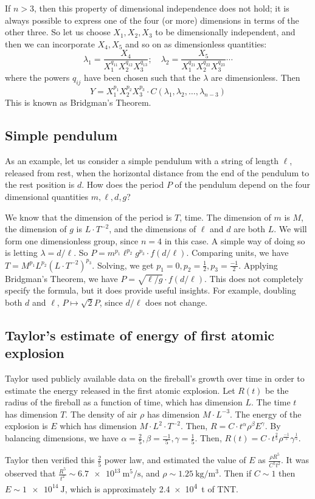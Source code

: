 If \(n > 3\), then this property of dimensional independence does not hold; it is always possible to express one of the four (or more) dimensions in terms of the other three.
So let us choose \(X_1, X_2, X_3\) to be dimensionally independent, and then we can incorporate \(X_4, X_5\) and so on as dimensionless quantities:
\[
	\lambda_1 = \frac{X_4}{X_1^{q_{11}}X_2^{q_{12}}X_3^{q_{13}}};\quad \lambda_2 = \frac{X_5}{X_1^{q_{21}}X_2^{q_{22}}X_3^{q_{23}}} \cdots
\]
where the powers \(q_{ij}\) have been chosen such that the \(\lambda\) are dimensionless.
Then
\[
	Y = X_1^{p_1}X_2^{p_2}X_3^{p_3} \cdot C(\lambda_1, \lambda_2, \dots, \lambda_{n-3})
\]
This is known as Bridgman's Theorem.

\subsection{Simple pendulum}
As an example, let us consider a simple pendulum with a string of length \(\ell\), released from rest, when the horizontal distance from the end of the pendulum to the rest position is \(d\).
How does the period \(P\) of the pendulum depend on the four dimensional quantities \(m, \ell, d, g\)?

We know that the dimension of the period is \(T\), time.
The dimension of \(m\) is \(M\), the dimension of \(g\) is \(L \cdot T^{-2}\), and the dimensions of \(\ell\) and \(d\) are both \(L\).
We will form one dimensionless group, since \(n=4\) in this case.
A simple way of doing so is letting \(\lambda = d/\ell\).
So \(P = m^{p_1} \ell^{p_2} g^{p_3} \cdot f(d/\ell)\).
Comparing units, we have \(T = M^{p_1} L^{p_2} (L \cdot T^{-2})^{p_3}\).
Solving, we get \(p_1 = 0, p_2 = \frac{1}{2}, p_3 = \frac{-1}{2}\).
Applying Bridgman's Theorem, we have \(P = \sqrt{\ell / g} \cdot f(d/\ell)\).
This does not completely specify the formula, but it does provide useful insights.
For example, doubling both \(d\) and \(\ell\), \(P \mapsto \sqrt{2} P\), since \(d/\ell\) does not change.

\subsection{Taylor's estimate of energy of first atomic explosion}
Taylor used publicly available data on the fireball's growth over time in order to estimate the energy released in the first atomic explosion.
Let \(R(t)\) be the radius of the fireball as a function of time, which has dimension \(L\).
The time \(t\) has dimension \(T\).
The density of air \(\rho\) has dimension \(M \cdot L^{-3}\).
The energy of the explosion is \(E\) which has dimension \(M \cdot L^2 \cdot T^{-2}\).
Then, \(R = C \cdot t^\alpha \rho^\beta E^\gamma\).
By balancing dimensions, we have \(\alpha = \frac{2}{5}, \beta = \frac{-1}{5}, \gamma = \frac{1}{5}\).
Then, \(R(t) = C \cdot t^{\frac{2}{5}} \rho^{\frac{-1}{5}} \gamma^{\frac{1}{5}}\).

Taylor then verified this \(\frac{2}{5}\) power law, and estimated the value of \(E\) as \(\frac{\rho R^5}{C^5 t^2}\).
It was observed that \(\frac{R^5}{t^2} \sim \SI{6.7e13}{\metre\tothe{5}\per\second}\), and \(\rho\sim\SI{1.25}{\kilogram\per\metre\cubed}\).
Then if \(C \sim 1\) then \(E \sim \SI{1e14}{\joule}\), which is approximately \SI{2.4e4}{\tonne} of TNT.\@
